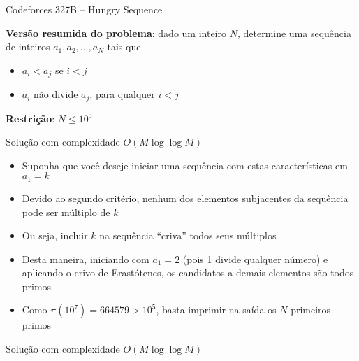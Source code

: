 \begin{frame}[fragile]{Codeforces 327B -- Hungry Sequence}

    \textbf{Versão resumida do problema}: dado um inteiro $N$, determine uma sequência de inteiros
        $a_1, a_2, \ldots, a_N$ tais que

    \begin{itemize}
        \item $a_i < a_j$ se $i < j$
        \item $a_i$ não divide $a_j$, para qualquer $i < j$
    \end{itemize}

    \vspace{0.1in}
    \textbf{Restrição}: $N \leq 10^5$

\end{frame}

\begin{frame}[fragile]{Solução com complexidade $O(M\log \log M)$}

    \begin{itemize}
        \item Suponha que você deseje iniciar uma sequência com estas características em $a_1 = k$

        \item Devido ao segundo critério, nenhum dos elementos subjacentes da sequência pode ser 
            múltiplo de $k$

        \item Ou seja, incluir $k$ na sequência ``criva'' todos seus múltiplos

        \item Desta maneira, iniciando com $a_1 = 2$ (pois 1 divide qualquer número) e aplicando
            o crivo de Erastótenes, os candidatos a demais elementos são todos primos

        \item Como $\pi(10^7) = 664579 > 10^5$, basta imprimir na saída os $N$ primeiros primos
    \end{itemize}

\end{frame}

\begin{frame}[fragile]{Solução com complexidade $O(M\log \log M)$}
\end{frame}
